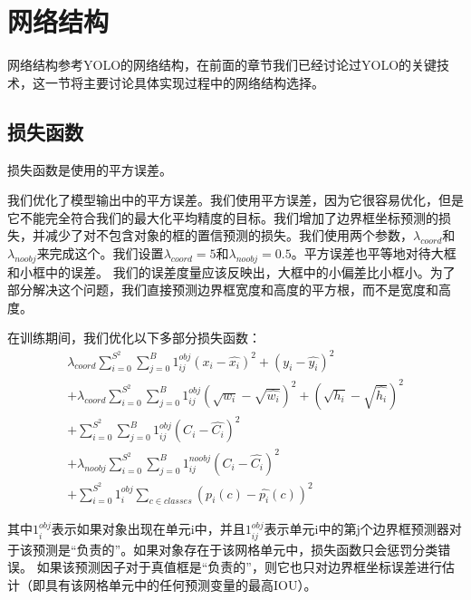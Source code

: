 \section{网络结构}{
网络结构参考YOLO的网络结构，在前面的章节我们已经讨论过YOLO的关键技术，这一节将主要讨论具体实现过程中的网络结构选择。

\subsection{损失函数}{
	损失函数是使用的平方误差。

	我们优化了模型输出中的平方误差。我们使用平方误差，因为它很容易优化，但是它不能完全符合我们的最大化平均精度的目标。我们增加了边界框坐标预测的损失，并减少了对不包含对象的框的置信预测的损失。我们使用两个参数，$\lambda_{coord}$和$\lambda_{noobj}$来完成这个。我们设置$\lambda_{coord}=5$和$\lambda_{noobj}=0.5$。平方误差也平等地对待大框和小框中的误差。 我们的误差度量应该反映出，大框中的小偏差比小框小。为了部分解决这个问题，我们直接预测边界框宽度和高度的平方根，而不是宽度和高度。

	在训练期间，我们优化以下多部分损失函数：
	\begin{eqnarray*}
	\lambda_{coord} \sum_{i=0}^{S^2} \sum_{j=0}^B 1_{ij}^{obj} (x_i - \hat{x_i})^2 + (y_i - \hat{y_i})^2 \\
	+ \lambda_{coord} \sum_{i=0}^{S^2} \sum_{j=0}^B 1_{ij}^{obj} (\sqrt{w_i} - \sqrt{\hat{w_i}})^2 + (\sqrt{h_i} - \sqrt{\hat{h_i}})^2 \\
	+ \sum_{i=0}^{S^2} \sum_{j=0}^B 1_{ij}^{obj} (C_i - \hat{C_i})^2 \\
	+ \lambda_{noobj} \sum_{i=0}^{S^2} \sum_{j=0}^B 1_{ij}^{noobj} (C_i - \hat{C_i})^2 \\
	+ \sum_{i=0}^{S^2} 1_{i}^{obj} \sum_{c \in classes} (p_i(c) - \hat{p_i}(c))^2
	\end{eqnarray*}

	其中$1_i^{obj}$表示如果对象出现在单元i中，并且$1_{ij}^{obj}$表示单元i中的第j个边界框预测器对于该预测是“负责的”。如果对象存在于该网格单元中，损失函数只会惩罚分类错误。 如果该预测因子对于真值框是“负责的”，则它也只对边界框坐标误差进行估计（即具有该网格单元中的任何预测变量的最高IOU）。
}

}
